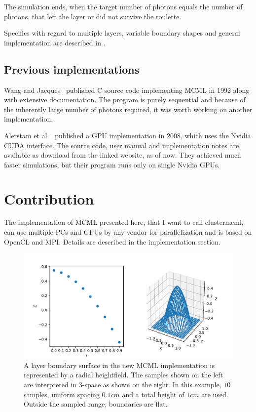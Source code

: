 \documentclass[]{article}
\begin{document}
The simulation ends, when the target number of photons equals the number of photons, that left the layer or did not survive the roulette.

Specifics with regard to multiple layers, variable boundary shapes and general implementation are described in .

\subsection{Previous implementations}

Wang and Jacques~\cite{wang1992monte} published C source code implementing MCML in 1992 along with extensive documentation. The program is purely sequential and because of the inherently large number of photons required, it was worth working on another implementation.

Alerstam et al.~\cite{alerstam2008parallel} published a GPU implementation in 2008, which uses the Nvidia CUDA interface. The source code, user manual and implementation notes are available as download from the linked website, as of now. They achieved much faster simulations, but their program runs only on single Nvidia GPUs.

\section{Contribution}

The implementation of MCML presented here, that I want to call clustermcml, can use multiple PCs and GPUs by any vendor for parallelization and is based on OpenCL and MPI. Details are described in the implementation section.

\begin{figure}[ht!]
	\includegraphics[width=\linewidth]{img/radial_heightfield.pdf}
	\caption{A layer boundary surface in the new MCML implementation is represented by a radial heightfield. The samples shown on the left are interpreted in 3-space as shown on the right. In this example, $10$ samples, uniform spacing $0.1cm$ and a total height of $1cm$ are used. Outside the sampled range, boundaries are flat.}
	\label{heightfield}
\end{figure}
\end{document}
